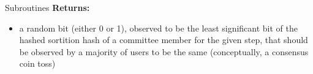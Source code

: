 \documentclass[10pt,a4paper]{article}
\begin{document}
\begin{section}{Subroutines}
\noindent \textbf{Returns:}
\begin{itemize}
    \item a random bit (either 0 or 1), observed to be the least significant bit of the hashed sortition hash of a committee member for the given step,
    that should be observed by a majority of users to be the same (conceptually, a consensus coin toss)
  \end{itemize}

\end{section}




\end{document}
